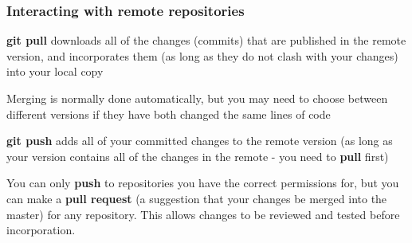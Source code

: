 \documentclass{beamer}
\newcommand{\code}[1]{{\fontfamily{pcr}\selectfont \textbf{#1}}}
\begin{document}
\begin{frame}
	\frametitle{Interacting with remote repositories}
		
	\code{git pull} downloads all of the changes (commits) that are published in the remote version, and incorporates them (as long as they do not clash with your changes) into your local copy
	
	Merging is normally done automatically, but you may need to choose between different versions if they have both changed the same lines of code 
	
	\par\noindent\hrulefill\par		
	
	\code{git push} adds all of your committed changes to the remote version (as long as your version contains all of the changes in the remote - you need to \code{pull} first)
	
	\bigskip
	You can only \code{push} to repositories you have the correct permissions for, but you can make a \code{pull request} (a suggestion that your changes be merged into the master) for any repository. This allows changes to be reviewed and tested before incorporation.
	
\end{frame}
\end{document}
